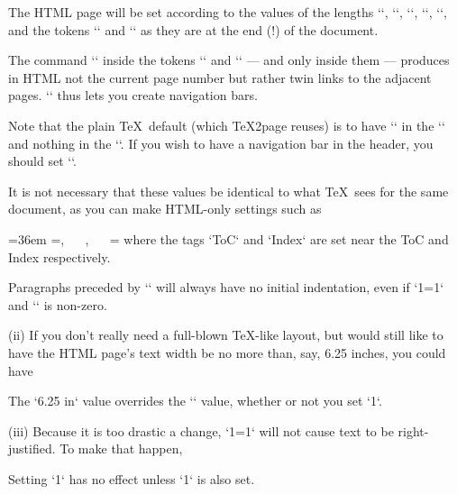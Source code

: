 \begintt
\let\TZPtexlayout=1
\endtt

%
The HTML page will be set according to the values of the
lengths `\hsize`, `\hoffset`, `\voffset`,
`\parskip`, `\parindent`, and the tokens `\headline`
and `\footline` as they are at the end (!) of
the document.

The command `\folio` inside the tokens `\headline` and `\footline`
— and only inside them —
produces in HTML not the current page number but rather twin links to the
adjacent pages. `\folio` thus lets you create navigation
bars.

Note that the plain \TeX\ default (which
\TeX2page reuses) is to have `\folio` in the
`\footline` and nothing in the `\headline`.  If you wish
to have a navigation bar in the header, you should set
`\headline`.

It is not necessary that these values be
identical to what \TeX\ sees for the same document, as you can
make HTML-only settings such as

%
\begintt
\ifx\shipout\UnDeFiNeD
  \hsize=36em
  \headline={\folio, ~~ , ~~ }
  \footline={\the\headline}  %
\fi
\endtt
%
 where the tags `ToC` and `Index` are set near
the ToC and Index respectively.

%
Paragraphs preceded by `\noindent` will always have no initial
indentation, even if `\TZPtexlayout=1` and `\parskip` is
non-zero.

%
\item(ii) If you don’t really need a full-blown \TeX-like layout, but would
still like to have the HTML page’s text width be no more than,
say, 6.25 inches, you could have

\begintt
\def\TZPhsize{6.25 in}
\endtt
%
The `\TZPhsize` value overrides the `\hsize` value, whether
or not you set `\TZPtexlayout`.

\item(iii) Because it is too drastic a change, `\TZPtexlayout=1` will not cause
text to be right-justified.  To make that happen,

\begintt
\let\TZPrightjustify=1
\endtt
%
Setting `\TZPrightjustify` has no effect unless `\TZPtexlayout` is
also set.

